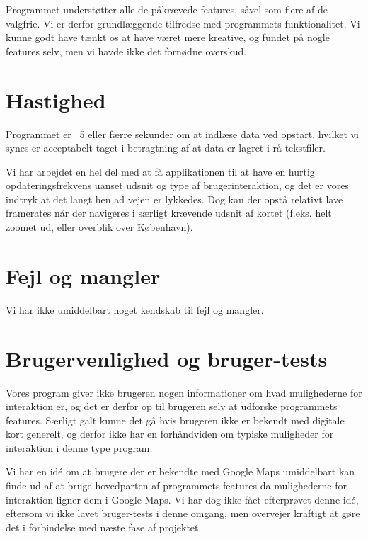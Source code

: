Programmet understøtter alle de påkrævede features, såvel som flere af de valgfrie. Vi er derfor grundlæggende tilfredse med programmets funktionalitet. Vi kunne godt have tænkt os at have været mere kreative, og fundet på nogle features selv, men vi havde ikke det fornødne overskud.

\section{Hastighed}

Programmet er ~5 eller færre sekunder om at indlæse data ved opstart, hvilket vi synes er acceptabelt taget i betragtning af at data er lagret i rå tekstfiler.

Vi har arbejdet en hel del med at få applikationen til at have en hurtig opdateringsfrekvens uanset udsnit og type af brugerinteraktion, og det er vores indtryk at det langt hen ad vejen er lykkedes. Dog kan der opstå relativt lave framerates når der navigeres i særligt krævende udsnit af kortet (f.eks. helt zoomet ud, eller overblik over København).

\section{Fejl og mangler}

Vi har ikke umiddelbart noget kendskab til fejl og mangler.

\section{Brugervenlighed og bruger-tests}

Vores program giver ikke brugeren nogen informationer om hvad mulighederne for interaktion er, og det er derfor op til brugeren selv at udforske programmets features. Særligt galt kunne det gå hvis brugeren ikke er bekendt med digitale kort generelt, og derfor ikke har en forhåndviden om typiske muligheder for interaktion i denne type program.

Vi har en idé om at brugere der er bekendte med Google Maps umiddelbart kan finde ud af at bruge hovedparten af programmets features da mulighederne for interaktion ligner dem i Google Maps. Vi har dog ikke fået efterprøvet denne idé, eftersom vi ikke lavet bruger-tests i denne omgang, men overvejer kraftigt at gøre det i forbindelse med næste fase af projektet. 